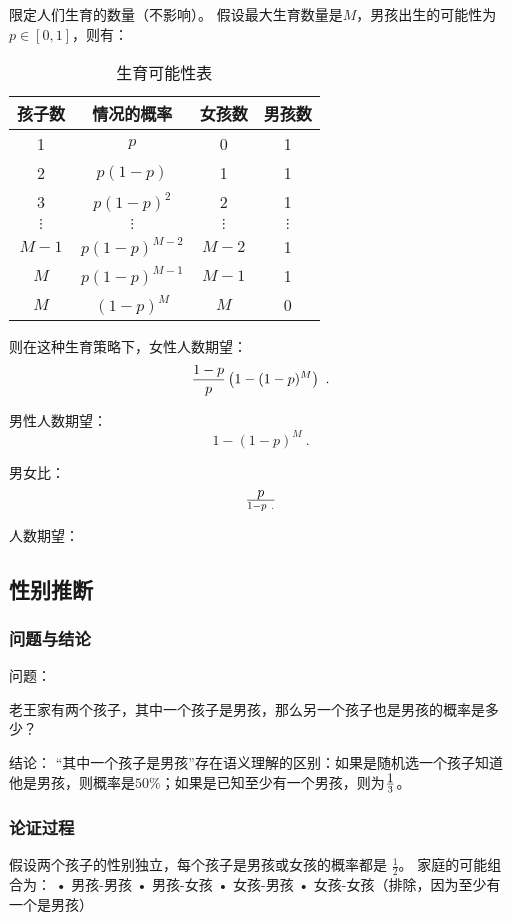 限定人们生育的数量（不影响）。
假设最大生育数量是$M$，男孩出生的可能性为$p\in[0,1]$，则有：

\begin{table}[ht]
\centering
\caption{生育可能性表}\label{tab_CitPrb1}
\begin{tabular}{|c|c|c|c|}
\hline
孩子数 & 情况的概率 & 女孩数 & 男孩数 \\
\hline
1 & $p$ & 0 & 1 \\
\hline
2 & $p(1-p)$ & 1 & 1 \\
\hline
3 & $p(1-p)^2$ & 2 & 1 \\
\hline
$\vdots$ & $\vdots$ & $\vdots$ & $\vdots$ \\
\hline
$M-1$ & $p(1-p)^{M-2}$ & $M-2$ & 1 \\
\hline
$M$ & $p(1-p)^{M-1}$ & $M-1$ & 1 \\
\hline
$M$ & $(1-p)^M$ & $M$ & 0 \\
\hline
\end{tabular}
\end{table}
则在这种生育策略下，女性人数期望：
\begin{equation}
{1-p\over p}\left(1-(1-p)^M\right)~.
\end{equation}

男性人数期望：
\begin{equation}
1-(1-p)^M~.
\end{equation}

男女比：
\begin{equation}
p\over 1-p~.
\end{equation}

人数期望：


\subsection{性别推断}

\subsubsection{问题与结论}

问题：

老王家有两个孩子，其中一个孩子是男孩，那么另一个孩子也是男孩的概率是多少？

结论：
“其中一个孩子是男孩”存在语义理解的区别：如果是随机选一个孩子知道他是男孩，则概率是$50\%$；如果是已知至少有一个男孩，则为$\displaystyle 1\over 3$。

\subsubsection{论证过程}
假设两个孩子的性别独立，每个孩子是男孩或女孩的概率都是 $\frac{1}{2}$。
家庭的可能组合为：
	•	男孩-男孩
	•	男孩-女孩
	•	女孩-男孩
	•	女孩-女孩（排除，因为至少有一个是男孩）

